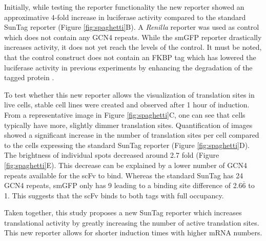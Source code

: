 Initially, while testing the reporter functionality the new reporter showed an approximative 4-fold increase in luciferase activity compared to the standard SunTag reporter (Figure \ref{fig:spaghetti}B).
A \textit{Renilla} reporter was used as control which does not contain any GCN4 repeats.
While the smGFP reporter drastically increases activity, it does not yet reach the levels of the control.
It must be noted, that the control construct does not contain an FKBP tag which has lowered the luciferase activity in previous experiments by enhancing the degradation of the tagged protein \cite{bonger_small_2011}.

To test whether this new reporter allows the visualization of translation sites in live cells, stable cell lines were created and observed after 1 hour of induction.
From a representative image in Figure \ref{fig:spaghetti}C, one can see that cells typically have more, slightly dimmer translation sites.
Quantification of images showed a significant increase in the number of translation sites per cell compared to the cells expressing the standard SunTag reporter (Figure \ref{fig:spaghetti}D).
The brightness of individual spots decreased around 2.7 fold (Figure \ref{fig:spaghetti}E).
This decrease can be explained by a lower number of GCN4 repeats available for the scFv to bind.
Whereas the standard SunTag has 24 GCN4 repeats, smGFP only has 9 leading to a binding site difference of 2.6$\overline{\mbox{6}}$ to 1.
This suggests that the scFv binds to both tags with full occupancy.

Taken together, this study proposes a new SunTag reporter which increases translational activity by greatly increasing the number of active translation sites.
This new reporter allows for shorter induction times with higher mRNA numbers.

